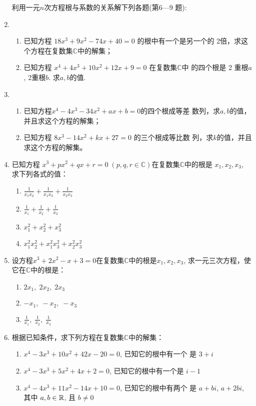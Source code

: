 \begin{enumerate}
利用一元$n$次方程根与系数的关系解下列各题(第6—9
题):

\item \begin{enumerate}[(1)]
    \item 已知方程 $18x^3+9x^2-74x+40=0$ 的根中有一个是另一个的 2倍，求这个方程在复数集$\mathbb{C}$中的解集；
    \item 已知方程 $x^4+4x^3+10x^2+12x+9=0$ 在复数集$\mathbb{C}$中
    的四个根是 2 重根$a$, 2重根$b$. 求$a,b$的值.
\end{enumerate}

\item \begin{enumerate}[(1)]
\item 已知方程$x^4-4x^3-34x^2+ax+b=0$的四个根成等差
    数列，求$a,b$的值，并且求这个方程的解集；
    \item 已知方程 $8x^3-14x^2+kx+27=0$ 的三个根成等比数
    列，求$k$的值，并且求这个方程的解集。
\end{enumerate}

\item 已知方程 $x^3+px^2+qx+r=0\; (p,q,r\in \mathbb{C})$在复数集$\mathbb{C}$中的根是 $x_1,x_2,x_3$, 求下列各式的值：
\begin{multicols}{2}
\begin{enumerate}[(1)]
    \item $\frac{1}{x_1x_2}+\frac{1}{x_1x_3}+\frac{1}{x_2x_3}$
    \item $\frac{1}{x_1}+\frac{1}{x_2}+\frac{1}{x_3}$
    \item $x_1^2+x_2^2+x_3^2$
    \item $x_1^2x_2^2+x_1^2x_3^2+x_2^2x_3^2$
\end{enumerate}
\end{multicols}
    
\item 设方程$x^3+2x^2-x+3=0$在复数集$\mathbb{C}$中的根是$x_1,x_2,x_3$, 求一元三次方程，使它在$\mathbb{C}$中的根是：
\begin{multicols}{3}
\begin{enumerate}[(1)]
    \item $2x_1,\; 2x_2,\; 2x_3$
    \item $-x_1,\; -x_2,\; -x_3$
    \item $\frac{1}{x_{1}},\; \frac{1}{x_{2}},\; \frac{1}{x_{3}}$
\end{enumerate}
\end{multicols}

\item 根据已知条件，求下列方程在复数集$\mathbb{C}$中的解集：
\begin{enumerate}[(1)]
\item $x^4-3x^3+10x^2+42x-20=0$, 已知它的根中有一个
    是 $3+i$ 
    \item $x^4-3x^3+5x^2+4x+2=0$, 已知它的根中有一个是
    $i- 1$
    \item $x^{4}-4x^{3}+11x^{2}-14x+10=0$, 已知它的根中有两个
    是 $a+bi$, $a+2bi$, 其中 $a,b\in \mathbb{R}$, 且 $b\neq0$
\end{enumerate}


\end{enumerate}
